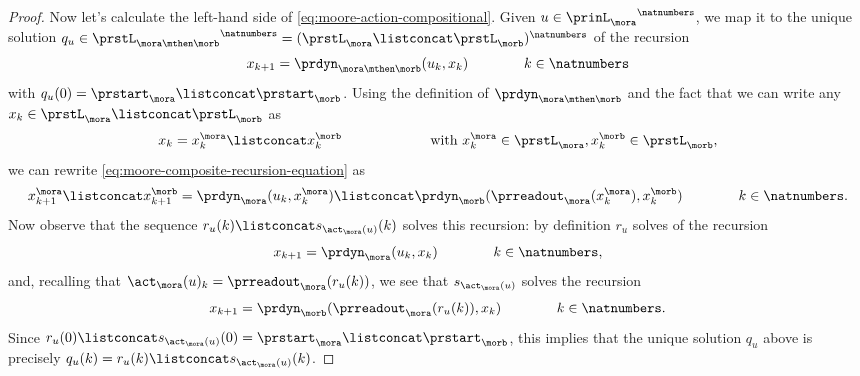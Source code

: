 \begin{proof}
    Now let's calculate the left-hand side of \cref{eq:moore-action-compositional}.
    Given $u \in {\prinL_{\mora}}^\natnumbers$, we map it to the unique solution $q_u \in {\prstL_{\mora \mthen \morb}}^\natnumbers = ({\prstL_{\mora} \listconcat \prstL_{\morb}})^\natnumbers$ of the recursion
    \begin{equation}
        \label{eq:moore-composite-recursion-equation}
        x_{k+1} = \prdyn_{\mora \mthen \morb}(u_k, x_k)  \qquad \qquad k \in \natnumbers
    \end{equation}
    with $q_u(0) = \prstart_{\mora} \listconcat \prstart_{\morb}$.
    Using the definition of $\prdyn_{\mora \mthen \morb}$ and the fact that we can write any $x_k \in \prstL_{\mora} \listconcat \prstL_{\morb}$ as
    $$x_k = x^\mora_k \listconcat x^\morb_k \qquad \qquad \qquad \text{ with } x^\mora_k \in \prstL_{\mora}, x^\morb_k \in \prstL_{\morb},$$
    we can rewrite \cref{eq:moore-composite-recursion-equation} as
    \begin{equation}
        x^\mora_{k+1} \listconcat x^\morb_{k+1} = \prdyn_{\mora}(u_k, x^\mora_k) \listconcat \prdyn_{\morb}(\prreadout_\mora(x^\mora_k), x^\morb_k)  \qquad \qquad k \in \natnumbers.
    \end{equation}
    Now observe that the sequence $r_u(k) \listconcat s_{\act_\mora(u)}(k)$ solves this recursion: by definition $r_u$ solves of the recursion
    \begin{equation}
        x_{k+1} = \prdyn_\mora(u_k, x_k)  \qquad \qquad k \in \natnumbers,
    \end{equation}
    and, recalling that $\act_\mora(u)_k = \prreadout_\mora(r_u(k))$, we see that $s_{\act_\mora(u)}$ solves the recursion
    \begin{equation}
        x_{k+1} = \prdyn_\morb(\prreadout_\mora(r_u(k)), x_k)  \qquad \qquad k \in \natnumbers.
    \end{equation}
    Since $r_u(0) \listconcat s_{\act_\mora(u)}(0) = \prstart_{\mora} \listconcat \prstart_{\morb}$, this implies that the unique solution $q_u$ above is precisely $q_u(k) = r_u(k) \listconcat s_{\act_\mora(u)}(k)$.


\end{proof}
